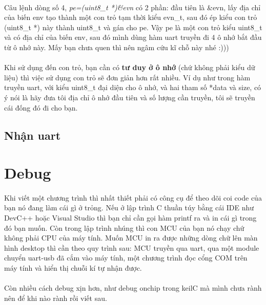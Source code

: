 \documentclass[12pt,a5paper]{book}
\begin{document}
\paragraph{}
Câu lệnh dòng số 4, \textit{pe=(uint8\_t *)\&evn} có 2 phần: đầu tiên là \&evn, lấy địa chỉ của biến env tạo thành một con trỏ tạm thời kiểu evn\_t, sau đó ép kiểu con trỏ (uint8\_t *) này thành uint8\_t và gán cho pe. Vậy pe là một con trỏ kiểu uint8\_t và có địa chỉ của biến env, sau đó mình dùng hàm uart truyền đi 4 ô nhớ bắt đầu từ ô nhớ này. Mấy bạn chưa quen thì nên ngâm cứu kĩ chỗ này nhé :)))
\paragraph{}
Khi sử dụng đến con trỏ, bạn cần có \textbf{tư duy ở ô nhớ} (chứ không phải kiểu dữ liệu) thì việc sử dụng con trỏ sẽ đơn giản hơn rất nhiều. Ví dụ như trong hàm truyền uart, với kiểu uint8\_t đại diện cho ô nhớ, và hai tham số *data và size, có ý nói là hãy đưa tôi địa chỉ ô nhớ đầu tiên và số lượng cần truyền, tôi sẽ truyền cái đống đó đi cho bạn.
\subsection{Nhận uart}
\paragraph{}
\section{Debug}
\paragraph{}
Khi viết một chương trình thì nhất thiết phải có công cụ để theo dõi coi code của bạn nó đang làm cái gì ở trỏng. Nếu ở lập trình C thuần túy bằng cái IDE như DevC++ hoặc Visual Studio thì bạn chỉ cần gọi hàm printf ra và in cái gì trong đó bạn muốn. Còn trong lập trình nhúng thì con MCU của bạn nó chạy chứ không phải CPU của máy tính. Muốn MCU in ra được những dòng chữ lên màn hình desktop thì cần theo quy trình sau: MCU truyền qua uart, qua một module chuyển uart-usb đã cắm vào máy tính, một chương trình đọc cổng COM trên máy tính và hiển thị chuỗi kí tự nhận được.
\paragraph{}
Còn nhiều cách debug xịn hơn, như debug onchip trong keilC mà mình chưa rành nên để khi nào rành rồi viết sau.
\end{document}
